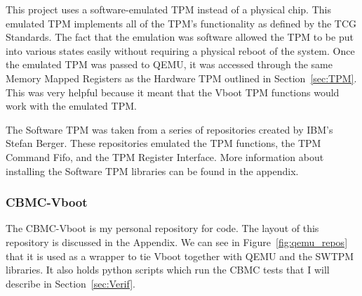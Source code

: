 \documentclass[../report.tex]{subfiles}
\begin{document}
This project uses a software-emulated TPM instead of a physical chip. 
This emulated TPM implements all of the TPM's functionality as defined by the
TCG Standards.
The fact that the emulation was software allowed the TPM to be put into various
states easily without requiring a physical reboot of the system.
Once the emulated TPM was passed to QEMU, it was accessed through the same
Memory Mapped Registers as the Hardware TPM outlined in Section~\ref{sec:TPM}.
This was very helpful because it meant that the Vboot TPM functions would work
with the emulated TPM.

The Software TPM was taken from a series of repositories created by IBM's
Stefan Berger. 
These repositories emulated the TPM functions\cite{TPMLibs}, the TPM Command
Fifo\cite{SWTPM}, and the TPM Register Interface\cite{TPMQEMU}. 
More information about installing the Software TPM libraries can be found in the
appendix.

\subsubsection{CBMC-Vboot}

The CBMC-Vboot is my personal repository for code\cite{my-repo}.
The layout of this repository is discussed in the Appendix.
We can see in Figure~\ref{fig:qemu_repos} that it is used as a wrapper to tie
Vboot together with QEMU and the SWTPM libraries.
It also holds python scripts which run the CBMC tests that I will describe in
Section~\ref{sec:Verif}.
\end{document}
